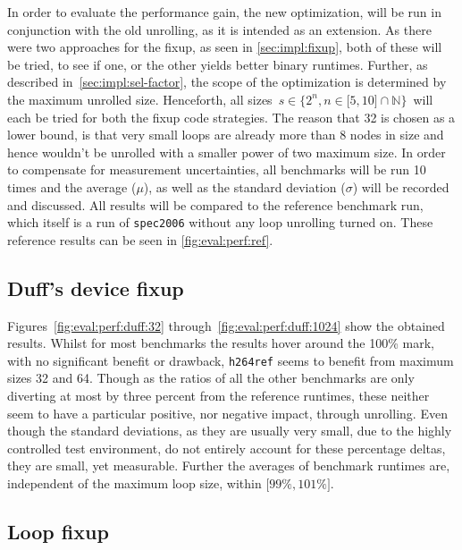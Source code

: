 In order to evaluate the performance gain, the new optimization, will be run in conjunction with the old unrolling, as it is intended as an extension.
As there were two approaches for the fixup, as seen in \cref{sec:impl:fixup}, both of these will be tried, to see if one, or the other yields better binary runtimes.
Further, as described in~\cref{sec:impl:sel-factor}, the scope of the optimization is determined by the maximum unrolled size.
Henceforth, all sizes~$s \in \{2^n, n \in \lbrack 5, 10 \rbrack \cap \mathbb{N}\}$~will each be tried for both the fixup code strategies.
The reason that 32 is chosen as a lower bound, is that very small loops are already more than 8 nodes in size and hence wouldn't be unrolled with a smaller power of two maximum size.
In order to compensate for measurement uncertainties, all benchmarks will be run 10 times and the average ($\mu$), as well as the standard deviation ($\sigma$) will be recorded and discussed.
All results will be compared to the reference benchmark run, which itself is a run of \texttt{spec2006} without any loop unrolling turned on.
These reference results can be seen in \cref{fig:eval:perf:ref}.



\subsection{Duff's device fixup}\label{sec:eval:perf:duff}



Figures~\ref{fig:eval:perf:duff:32} through~\ref{fig:eval:perf:duff:1024} show the obtained results.
Whilst for most benchmarks the results hover around the 100\% mark, with no significant benefit or drawback, \texttt{h264ref} seems to benefit from maximum sizes 32 and 64.
Though as the ratios of all the other benchmarks are only diverting at most by three percent from the reference runtimes, these neither seem to have a particular positive, nor negative impact, through unrolling.
Even though the standard deviations, as they are usually very small, due to the highly controlled test environment, do not entirely account for these percentage deltas, they are small, yet measurable.
Further the averages of benchmark runtimes are, independent of the maximum loop size, within $\lbrack 99\%, 101\% \rbrack$.

\subsection{Loop fixup}\label{sec:eval:perf:loop}